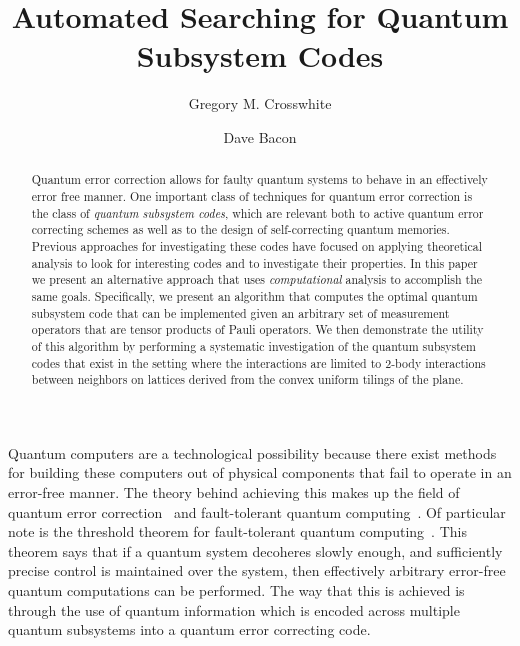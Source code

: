 \documentclass[twocolumn,showpacs,preprintnumbers,amsmath,amssymb,nofootinbib,pra,floatfix]{revtex4-1}
\begin{document}
\title{Automated Searching for Quantum Subsystem Codes}

\author{Gregory M. Crosswhite}
\author{Dave Bacon}



\begin{abstract}
Quantum error correction allows for faulty quantum systems to behave in an effectively error free manner.  One important class of techniques for quantum error correction is the class of \emph{quantum subsystem codes}, which are relevant both to active quantum error correcting schemes as well as to the design of self-correcting quantum memories.
Previous approaches for investigating these codes have focused on applying theoretical analysis to look for interesting codes and to investigate their properties.  In this paper we present an alternative approach that uses \emph{computational} analysis to accomplish the same goals.  Specifically, we present an algorithm that computes the optimal quantum subsystem code that can be implemented given an arbitrary set of measurement operators that are tensor products of Pauli operators.  We then demonstrate the utility of this algorithm by performing a systematic investigation of the quantum subsystem codes that exist in the setting where the interactions are limited to 2-body interactions between neighbors on lattices derived from the convex uniform tilings of the plane.
\end{abstract}

\maketitle

\newpage


Quantum computers are a technological possibility because there exist methods for building these computers out of physical components that fail to operate in an error-free manner.  The theory behind achieving this makes up the field of quantum error correction~\cite{Shor:95a,Steane:96a,Steane:96b,Steane:96c,Knill:97a,Gottesman:97a} and fault-tolerant quantum computing~\cite{Shor:96a,Aharonov:97a,Knill:98a,Knill:98b,Preskill:98a,Aliferis:05a}. Of particular note is the threshold theorem for fault-tolerant quantum computing~\cite{Aharonov:97a,Knill:98a,Knill:98b,Aliferis:05a}.  This theorem says that if a quantum system decoheres slowly enough, and sufficiently precise control is maintained over the system, then effectively arbitrary error-free quantum computations can be performed.  The way that this is achieved is through the use of quantum information which is encoded across multiple quantum subsystems into a quantum error correcting code.
\end{document}
